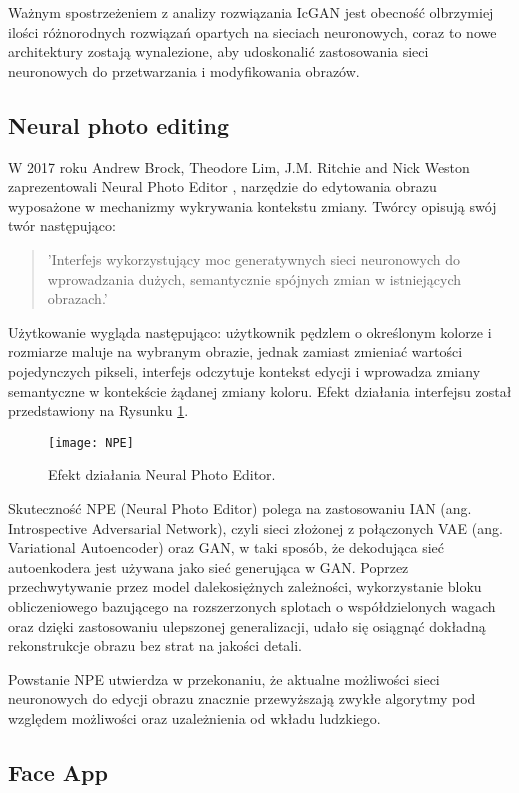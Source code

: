     Ważnym spostrzeżeniem z analizy rozwiązania IcGAN jest obecność
    olbrzymiej ilości różnorodnych rozwiązań opartych na sieciach neuronowych,
    coraz to nowe architektury zostają wynalezione, aby udoskonalić
    zastosowania sieci neuronowych do przetwarzania i modyfikowania obrazów.

  \subsection{Neural photo editing}
    W 2017 roku Andrew Brock, Theodore Lim, J.M. Ritchie and Nick Weston
    zaprezentowali Neural Photo Editor \cite{neural_photo_editor}, narzędzie
    do edytowania obrazu wyposażone w mechanizmy wykrywania kontekstu zmiany.
    Twórcy opisują swój twór następująco:

    \begin{quote}
      'Interfejs wykorzystujący moc generatywnych sieci neuronowych do
      wprowadzania dużych, semantycznie spójnych zmian w istniejących obrazach.'
    \end{quote}

    Użytkowanie wygląda następująco: użytkownik pędzlem o określonym kolorze i
    rozmiarze maluje na wybranym obrazie, jednak zamiast zmieniać wartości
    pojedynczych pikseli, interfejs odczytuje kontekst edycji i wprowadza zmiany
    semantyczne w kontekście żądanej zmiany koloru. Efekt działania interfejsu
    został przedstawiony na Rysunku \ref{fig:npe}.

    \begin{figure}[ht]
      \centering
      \texttt{[image: NPE]}
      \caption{Efekt działania Neural Photo Editor.}
      \label{fig:npe}
    \end{figure}

    Skuteczność NPE (Neural Photo Editor) polega na zastosowaniu IAN
    (ang. Introspective Adversarial Network), czyli sieci złożonej z połączonych
    VAE (ang. Variational Autoencoder) \cite{vae} oraz GAN, w taki sposób, że dekodująca
    sieć autoenkodera jest używana jako sieć generująca w GAN.
    Poprzez przechwytywanie przez model dalekosiężnych zależności, wykorzystanie
    bloku obliczeniowego bazującego na rozszerzonych splotach o
    współdzielonych wagach oraz dzięki zastosowaniu ulepszonej generalizacji,
    udało się osiągnąć dokładną rekonstrukcje obrazu bez strat na jakości detali.

    Powstanie NPE utwierdza w przekonaniu, że aktualne możliwości sieci
    neuronowych do edycji obrazu znacznie przewyższają zwykłe algorytmy pod
    względem możliwości oraz uzależnienia od wkładu ludzkiego.


  \subsection{Face App}
